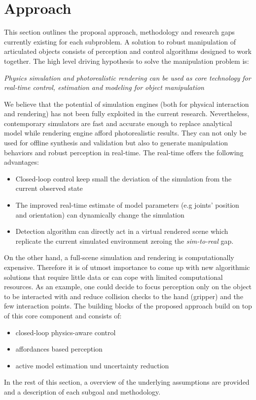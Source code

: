 \section{Approach}
\label{sec:Approach}

This section outlines the proposal approach, methodology and research gaps currently existing for each subproblem. A solution to robust manipulation of articulated objects consists of perception and control algorithms designed to work together. The high level driving hypothesis to solve the manipulation problem is:
\begin{displayquote}
\textit{Physics simulation and photorealistic rendering can be used as core technology for real-time control, estimation and modeling for object manipulation}
\end{displayquote}   
We believe that the potential of simulation engines (both for physical interaction and rendering) has not been fully exploited in the current research. Nevertheless, contemporary simulators are fast and accurate enough to replace analytical model while rendering engine afford photorealistic results. They can not only be used for offline synthesis and validation but also to generate manipulation behaviors and robust perception in real-time. The real-time offers the following advantages:
\begin{itemize}
\item Closed-loop control keep small the deviation of the simulation from the current observed state
\item The improved real-time estimate of model parameters (e.g joints' position and orientation) can dynamically change the simulation
\item Detection algorithm can directly act in a virtual rendered scene which replicate the current simulated environment zeroing the \emph{sim-to-real} gap.
\end{itemize}
On the other hand, a full-scene simulation and rendering is computationally expensive. Therefore it is of utmost importance to come up with new algorithmic solutions that require little data or can cope with limited computational resources. As an example, one could decide to focus perception only on the object to be interacted with and reduce collision checks to the hand (gripper) and the few interaction points.  
The building blocks of the proposed approach build on top of this core component and consists of:
\begin{itemize}
\item closed-loop physics-aware control
\item affordances based perception
\item active model estimation und uncertainty reduction
\end{itemize}
In the rest of this section, a overview of the underlying assumptions are provided and a description of each subgoal and methodology. 

